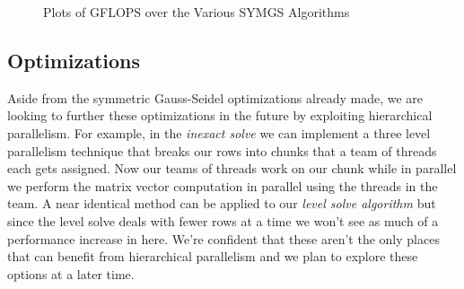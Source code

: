 \documentclass{ccr15}
\begin{document}
\begin{figure}[h]
\caption{Plots of GFLOPS over the Various SYMGS Algorithms}
\label{CombineSYMGS}
\end{figure}

\subsection{Optimizations}
Aside from the symmetric Gauss-Seidel optimizations already made, we are looking to further these
optimizations in the future by exploiting hierarchical parallelism. For example, in the \emph{inexact
solve} we can implement a three level parallelism technique that breaks our rows into chunks that 
a team of threads each gets assigned. Now our teams of threads work on our chunk while in
parallel we perform the matrix vector computation in parallel using the threads in the team. A
near identical method can be applied to our \emph{level solve algorithm} but since the level solve deals
with fewer rows at a time we won't see as much of a performance increase in here. We're confident
that these aren't the only places that can benefit from hierarchical parallelism and we plan to
explore these options at a later time.
\end{document}
